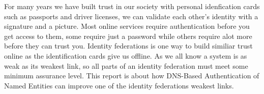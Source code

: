 For many years we have built trust in our society with personal idenfication cards such as passports and driver licenses, we can validate each other's identity with a signature and a picture.
Most online services require authentication before you get access to them, some require just a password while others require alot more before they can trust you.
Identity federations is one way to build similiar trust online as the identification cards give us offline.
As we all know a system is as weak as its weakest link, so all parts of an identity federation must meet some minimum assurance level.
This report is about how DNS-Based Authentication of Named Entities can improve one of the identity federations weakest links.





